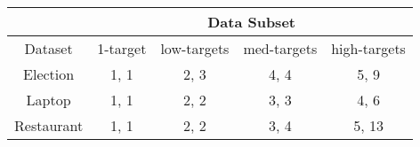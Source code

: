 \begin{tabular}{|c|c|c|c|c|}
\hline
        & \multicolumn{4}{c|}{Data Subset} \\
\hline
Dataset &  1-target & low-targets  & med-targets & high-targets \\
\hline
Election   &  1, 1 &     2, 3  & 4, 4  &   5, 9 \\
\hline
Laptop     &  1, 1 &    2, 2  &     3, 3 &     4, 6 \\
\hline
Restaurant &  1, 1 &    2, 2 &     3, 4 &     5, 13 \\
\hline
\end{tabular}